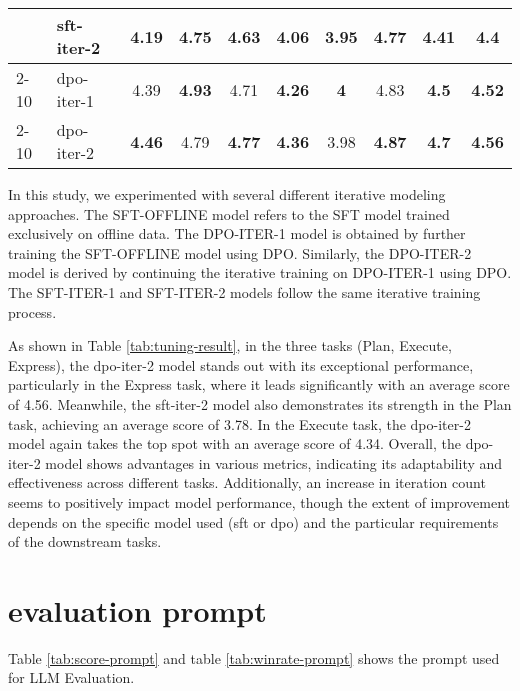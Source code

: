 \documentclass[11pt]{article}
\begin{document}
\begin{table*}
{\begin{tabular}{ll|c|c|c|c|c|c|c|c}
\multicolumn{1}{l|}{} &
  sft-iter-2 &
  4.19 &
  4.75 &
  \textbf{4.63} &
  4.06 &
  3.95 &
  4.77 &
  4.41 &
  4.4 \\ \cline{2-10} 
\multicolumn{1}{l|}{} & dpo-iter-1 & 4.39          & \textbf{4.93} & 4.71          & \textbf{4.26} & \textbf{4} & 4.83          & \textbf{4.5}  & \textbf{4.52} \\ \cline{2-10} 
\multicolumn{1}{l|}{} & dpo-iter-2 & \textbf{4.46} & 4.79          & \textbf{4.77} & \textbf{4.36} & 3.98       & \textbf{4.87} & \textbf{4.7}  & \textbf{4.56} \\ \hline
\end{tabular}%
}
\caption{Results for individual agents}
\label{tab:tuning-result}
\tiny
\end{table*}

\label{sec:tuning-inds}
In this study, we experimented with several different iterative modeling approaches. The SFT-OFFLINE model refers to the SFT model trained exclusively on offline data. The DPO-ITER-1 model is obtained by further training the SFT-OFFLINE model using DPO. Similarly, the DPO-ITER-2 model is derived by continuing the iterative training on DPO-ITER-1 using DPO. The SFT-ITER-1 and SFT-ITER-2 models follow the same iterative training process.

As shown in Table \ref{tab:tuning-result}, in the three tasks (Plan, Execute, Express), the dpo-iter-2 model stands out with its exceptional performance, particularly in the Express task, where it leads significantly with an average score of 4.56. Meanwhile, the sft-iter-2 model also demonstrates its strength in the Plan task, achieving an average score of 3.78. In the Execute task, the dpo-iter-2 model again takes the top spot with an average score of 4.34.
Overall, the dpo-iter-2 model shows advantages in various metrics, indicating its adaptability and effectiveness across different tasks. Additionally, an increase in iteration count seems to positively impact model performance, though the extent of improvement depends on the specific model used (sft or dpo) and the particular requirements of the downstream tasks.

\section{evaluation prompt}
Table \ref{tab:score-prompt} and table \ref{tab:winrate-prompt} shows the prompt used for LLM Evaluation.
\end{document}
